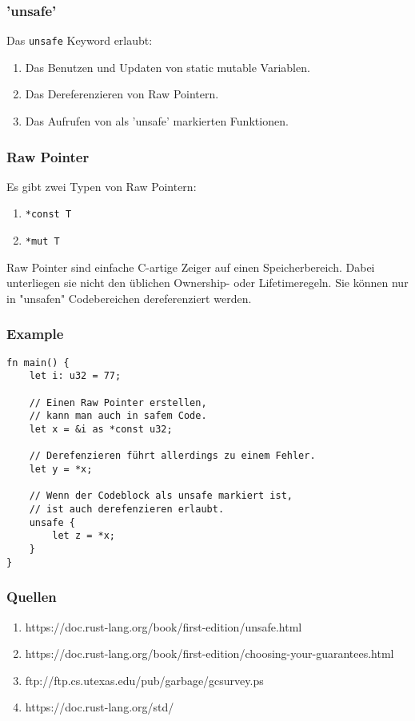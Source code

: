 \documentclass{beamer}
\begin{document}
\begin{frame}
	\frametitle{'unsafe'}
	Das \texttt{unsafe} Keyword erlaubt:
	\begin{enumerate}
		\item Das Benutzen und Updaten von static mutable Variablen.
		\item Das Dereferenzieren von Raw Pointern.
		\item Das Aufrufen von als 'unsafe' markierten Funktionen.
	\end{enumerate}
\end{frame}
\begin{frame}[fragile]
	\frametitle{Raw Pointer}
	Es gibt zwei Typen von Raw Pointern:
	\begin{enumerate}
		\item \texttt{*const T}
		\item \texttt{*mut T}
	\end{enumerate}
	\vspace{1cm}
	Raw Pointer sind einfache C-artige Zeiger auf einen Speicherbereich. Dabei unterliegen sie nicht den üblichen Ownership- oder Lifetimeregeln. Sie können nur in "unsafen" Codebereichen dereferenziert werden.
\end{frame}
\begin{frame}[fragile]
	\frametitle{Example}
	\begin{verbatim}
fn main() {
	let i: u32 = 77;

	// Einen Raw Pointer erstellen,
	// kann man auch in safem Code.
	let x = &i as *const u32;

	// Derefenzieren führt allerdings zu einem Fehler.
	let y = *x;

	// Wenn der Codeblock als unsafe markiert ist,
	// ist auch derefenzieren erlaubt.
	unsafe {
		let z = *x;
	}
}
	\end{verbatim}
\end{frame}
\begin{frame}
	\frametitle{Quellen}
	\begin{enumerate}
		\item https://doc.rust-lang.org/book/first-edition/unsafe.html
		\item https://doc.rust-lang.org/book/first-edition/choosing-your-guarantees.html
		\item ftp://ftp.cs.utexas.edu/pub/garbage/gcsurvey.ps
		\item https://doc.rust-lang.org/std/
	\end{enumerate}
\end{frame}
\end{document}
